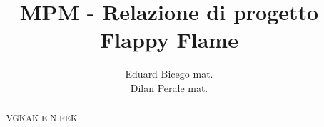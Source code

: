 \documentclass[italian,babel]{article}
\title{\Large MPM - Relazione di progetto \\ \Huge \textbf{Flappy Flame}}
\author{Eduard Bicego \quad mat. \\ Dilan Perale \quad mat.}
\begin{document}
\maketitle

\begin{abstract}
	VGKAK E N FEK
\end{abstract}

\newpage


%


\end{document}
